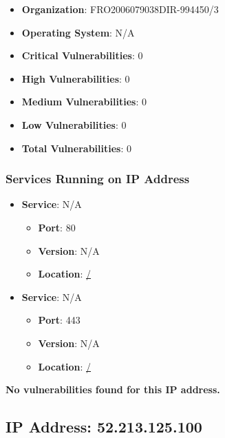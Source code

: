 \documentclass{article}
\begin{document}
\begin{itemize}
    \item \textbf{Organization}: FRO2006079038DIR-994450/3
    \item \textbf{Operating System}:  N/A 
    \item \textbf{Critical Vulnerabilities}: 0
    \item \textbf{High Vulnerabilities}: 0
    \item \textbf{Medium Vulnerabilities}: 0
    \item \textbf{Low Vulnerabilities}: 0
    \item \textbf{Total Vulnerabilities}: 0
\end{itemize}

\subsubsection*{Services Running on IP Address}

\begin{itemize}
    
        \item \textbf{Service}: N/A
        \begin{itemize}
            \item \textbf{Port}: 80
            \item \textbf{Version}:  N/A 
            \item \textbf{Location}: \href{ / }{ / }
        \end{itemize}
    
        \item \textbf{Service}: N/A
        \begin{itemize}
            \item \textbf{Port}: 443
            \item \textbf{Version}:  N/A 
            \item \textbf{Location}: \href{ / }{ / }
        \end{itemize}
    
\end{itemize}


\textbf{No vulnerabilities found for this IP address.}




\clearpage



\subsection{IP Address: 52.213.125.100}
\end{document}
